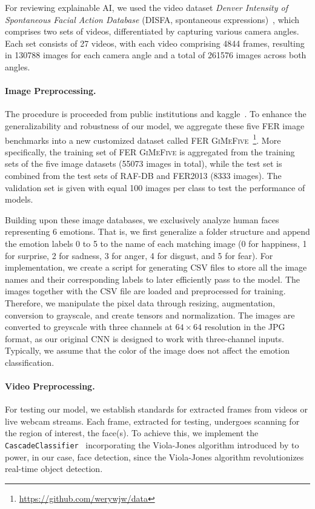 For reviewing explainable AI, 
we used the video dataset \textit{Denver Intensity of Spontaneous Facial Action Database} 
(DISFA, spontaneous expressions)~\cite{MavadatiMBTC13}, 
which comprises two sets of videos, 
differentiated by capturing various camera angles. 
Each set consists of 27 videos, with each video comprising 4844 frames, 
resulting in 130788 images for each camera angle and a total of 261576 images across both angles. 

\paragraph{Image Preprocessing.}
The procedure is proceeded from public institutions and kaggle~\cite{kaggle_rafdb,kagaff}. 
To enhance the generalizability and robustness of our model, 
we aggregate these five FER image benchmarks into a new customized dataset called FER 
\textsc{GiMeFive}~\footnote{\url{https://github.com/werywjw/data}}. 
More specifically, 
the training set of FER \textsc{GiMeFive} is aggregated from the training sets of the five image datasets (55073 images in total), 
while the test set is combined from the test sets of RAF-DB and FER2013 (8333 images). 
The validation set is given with equal 100 images per class to test the performance of models. 

Building upon these image databases, we exclusively analyze human faces representing 6 emotions. 
That is, we first generalize a folder structure and append the emotion labels 0 to 5 to the name of each matching image 
(0 for happiness, 1 for surprise, 2 for sadness, 3 for anger, 4 for disgust, and 5 for fear).
For implementation, 
we create a script for generating CSV files to store all the image names and their corresponding labels to later efficiently pass to the model. 
The images together with the CSV file are loaded and preprocessed for training. 
Therefore, we manipulate the pixel data through resizing, 
augmentation, conversion to grayscale, and create tensors and normalization. 
The images are converted to greyscale with three channels at $64 \times 64$ resolution in the JPG format, 
as our original CNN is designed to work with three-channel inputs. 
Typically, we assume that the color of the image does not affect the emotion classification. 

\paragraph{Video Preprocessing.}
For testing our model, we establish standards for extracted frames from videos or live webcam streams. 
Each frame, extracted for testing, undergoes scanning for the region of interest, the face(s). 
To achieve this, 
we implement the \texttt{CascadeClassifier}~\cite{casc_class} incorporating the Viola-Jones algorithm introduced by \citet{990517} to power, 
in our case, face detection, 
since the Viola-Jones algorithm revolutionizes real-time object detection. 


